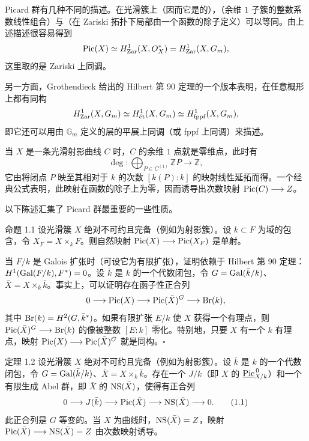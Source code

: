 Picard 群有几种不同的描述。在光滑簇上（因而它是的），（余维 $1$ 子簇的整数系数线性组合）与（在 Zariski 拓扑下局部由一个函数的除子定义）可以等同。由上述描述很容易得到
\[
\operatorname{Pic}(X)\simeq H^1_{\mathrm{Zar}}(X,O_X^*)=H^1_{\mathrm{Zar}}(X,G_m),
\]
这里取的是 Zariski 上同调。

另一方面，Grothendieck 给出的 Hilbert 第 90 定理的一个版本表明，在任意概形上都有同构
\[
H^1_{\mathrm{Zar}}(X,G_m)\simeq H^1_{\mathrm{\acute et}}(X,G_m)\simeq H^1_{\mathrm{fppf}}(X,G_m),
\]
即它还可以用由 $\mathbb G_m$ 定义的层的平展上同调（或 fppf 上同调）来描述。

当 $X$ 是一条光滑射影曲线 $C$ 时，$C$ 的余维 $1$ 点就是零维点，此时有
\[
\deg:\bigoplus_{P\in C^{(1)}}\mathbb ZP\longrightarrow\mathbb Z,
\]
它由将闭点 $P$ 映至其相对于 $k$ 的次数 $[k(P):k]$ 的映射线性延拓而得。一个经典公式表明，此映射在函数的除子上为零，因而诱导出次数映射 $\operatorname{Pic}(C)\longrightarrow Z$。

以下陈述汇集了 Picard 群最重要的一些性质。
\begin{statement}{命题 1.1}
设光滑簇 $X$ 绝对不可约且完备（例如为射影簇）。设 $k\subset F$ 为域的包含，令 $X_F=X\times_kF$。则自然映射 $\operatorname{Pic}(X)\longrightarrow\operatorname{Pic}(X_F)$ 是单射。
\end{statement}
当 $F/k$ 是 Galois 扩张时（可设它为有限扩张），证明依赖于 Hilbert 第 90 定理：$H^1(\operatorname{Gal}(F/k),F^*)=0$。设 $\bar k$ 是 $k$ 的一个代数闭包，令 $G=\operatorname{Gal}(\bar k/k)$、$\bar X=X\times_k\bar k$。事实上，可以证明存在函子性正合列
\[
0\longrightarrow\operatorname{Pic}(X)\longrightarrow\operatorname{Pic}(\bar X)^G\longrightarrow\operatorname{Br}(k),
\]
其中 $\operatorname{Br}(k)=H^2(G,\bar k^*)$。如果有限扩张 $E/k$ 使 $X$ 获得一个有理点，则 $\operatorname{Pic}(\bar X)^G\longrightarrow\operatorname{Br}(k)$ 的像被整数 $[E:k]$ 零化。特别地，只要 $X$ 有一个 $k$ 有理点，映射 $\operatorname{Pic}(X)\longrightarrow\operatorname{Pic}(\bar X)^G$ 就是同构。\hfill$\square$

\begin{statement}{定理 1.2}
设光滑簇 $X$ 绝对不可约且完备（例如为射影簇）。设 $\bar k$ 是 $k$ 的一个代数闭包，令 $G=\operatorname{Gal}(\bar k/k)$、$\bar X=X\times_k\bar k$。存在一个 $J/k$（即 $X$ 的 $\underline{\operatorname{Pic}}^{\,0}_{X/k}$）和一个有限生成 Abel 群，即 $\bar X$ 的 $\operatorname{NS}(\bar X)$，使得有正合列
\begin{equation*}
0\longrightarrow J(\bar k)\longrightarrow\operatorname{Pic}(\bar X)\longrightarrow\operatorname{NS}(\bar X)\longrightarrow0.\tag{1.1}
\end{equation*}
此正合列是 $G$ 等变的。当 $X$ 为曲线时，$\operatorname{NS}(\bar X)=Z$，映射 $\operatorname{Pic}(\bar X)\longrightarrow\operatorname{NS}(\bar X)=Z$ 由次数映射诱导。
\end{statement}

